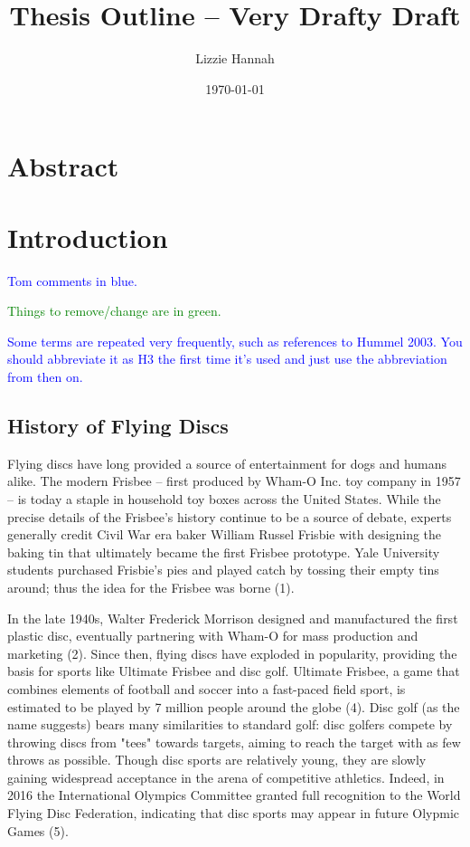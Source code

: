 \documentclass[a4paper,12pt, oneside]{article}
\title{Thesis Outline -- Very Drafty Draft}
\author{Lizzie Hannah}
\date{\today}
\newcommand{\blue}[1]{\textcolor{blue}{#1}}
\newcommand{\green}[1]{\textcolor{green}{#1}}
\begin{document}
\maketitle
\section{Abstract}
\section{Introduction}

\blue{Tom comments in blue.}

\green{Things to remove/change are in green.}

\blue{Some terms are repeated very frequently, 
  such as references to Hummel 2003. 
  You should abbreviate it as H3 the first time it's used and
  just use the abbreviation from then on.}
\subsection{History of Flying Discs}
Flying discs have long provided a source of entertainment for dogs and humans alike.  The modern Frisbee -- first produced by Wham-O Inc. toy company in 1957 -- is today a staple in household toy boxes across the United States.  While the precise details of the Frisbee's history continue to be a source of debate, experts generally credit Civil War era baker William Russel Frisbie with designing the baking tin that ultimately became the first Frisbee prototype.  Yale University students purchased Frisbie's pies and played catch by tossing their empty tins around; thus the idea for the Frisbee was borne (1).  

In the late 1940s, Walter Frederick Morrison designed and manufactured the first plastic disc, eventually partnering with Wham-O for mass production and marketing (2). Since then, flying discs have exploded in popularity, providing the basis for sports like Ultimate Frisbee and disc golf. Ultimate Frisbee, a game that combines elements of football and soccer into a fast-paced field sport, is estimated to be played by 7 million people around the globe (4).  Disc golf (as the name suggests) bears many similarities to standard golf: disc golfers compete by throwing discs from "tees" towards targets, aiming to reach the target with as few throws as possible. Though disc sports are relatively young, they are slowly gaining widespread acceptance in the arena of competitive athletics. Indeed, in 2016 the International Olympics Committee granted full recognition to the World Flying Disc Federation, indicating that disc sports may appear in future Olypmic Games (5).
\end{document}
